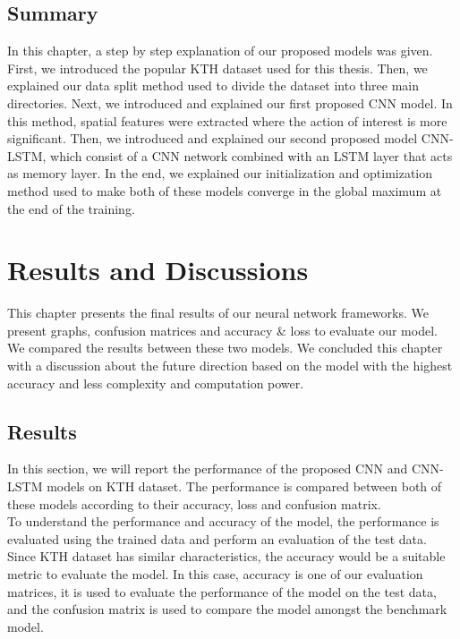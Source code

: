\section{Summary}
In this chapter, a step by step explanation of our proposed models was given. First, we introduced the popular KTH dataset used for this thesis. Then, we explained our data split method used to divide the dataset into three main directories. Next, we introduced and explained our first proposed CNN model. In this method, spatial features were extracted where the action of interest is more significant. Then, we introduced and explained our second proposed model CNN-LSTM, which consist of a CNN network combined with an LSTM layer that acts as memory layer. In the end, we explained our initialization and optimization method used to make both of these models converge in the global maximum at the end of the training.

\chapter{Results and Discussions}

This chapter presents the final results of our neural network frameworks. We present graphs, confusion matrices and accuracy \& loss to evaluate our model. We compared the results between these two models. We concluded this chapter with a discussion about the future direction based on the model with the highest accuracy and less complexity and computation power.

\section{Results}
In this section, we will report the performance of the proposed CNN and CNN-LSTM models on KTH dataset. The performance is compared between both of these models according to their accuracy, loss and confusion matrix.\\

To understand the performance and accuracy of the model, the performance is evaluated using the trained data and perform an evaluation of the test data. Since KTH dataset has similar characteristics, the accuracy would be a suitable metric to evaluate the model. In this case, accuracy is one of our evaluation matrices, it is used to evaluate the performance of the model on the test data, and the confusion matrix is used to compare the model amongst the benchmark model.\\

